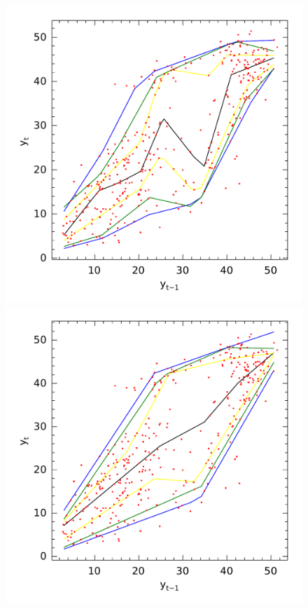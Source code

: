 \begin{figure}[htp]
\begin{minipage}[t]{0.4\linewidth}
\begin{minipage}[b]{\linewidth}
     \end{minipage}
  \end{minipage}
  \begin{minipage}[t]{0.4\linewidth}
    \centering
    \begin{minipage}[t]{\linewidth}
      \centering     \includegraphics[width=\textwidth]{Figuras/npqar/icaraizinho-crossing-3}
    \end{minipage}
    \begin{minipage}[b]{\linewidth}
      \centering     \includegraphics[width=\textwidth]{Figuras/npqar/icaraizinho-crossing-10}

\end{minipage}
\end{minipage}
\end{figure}
